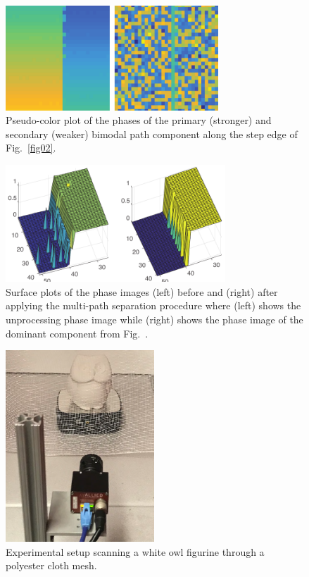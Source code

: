 \documentclass[10pt]{article}
\begin{document}
\begin{figure}[!t]
\centering\includegraphics[width=3.15in]{Figures/figure08}
\caption{Pseudo-color plot of the phases of the primary (stronger) and secondary (weaker) bimodal path component along the step edge of Fig.~\ref{fig02}.}
\label{fig08}
\end{figure}

\begin{figure}[!t]
\centering\includegraphics[width=3.25in]{Figures/figure10}
\caption{Surface plots of the phase images (left) before and (right) after applying the multi-path separation procedure where (left) shows the unprocessing phase image while (right) shows the phase image of the dominant component from Fig.~\label{fig08}.}
\label{fig09}
\end{figure}

\begin{figure}[!t]
	\centering\includegraphics[width=2.2in]{Figures/setup}
	\caption{Experimental setup scanning a white owl figurine through a polyester cloth mesh.}
	\label{img00}
\end{figure}
\end{document}
